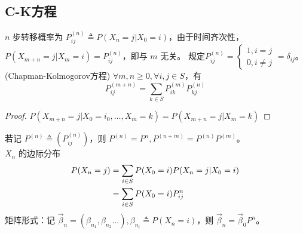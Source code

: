 \documentclass[./main.tex]{subfiles}
\begin{document}
\subsection{C-K方程}
$n$ 步转移概率为 $P_{ij}^{(n)}\triangleq P(X_n=j|X_0=i)$，由于时间齐次性，$P(X_{m+n}=j|X_m=i)=P_{ij}^{(n)}$，即与 $m$ 无关。
规定$P_{ij}^{(n)}=\begin{cases}1,i=j\\0,i\neq j\end{cases}=\delta_{ij}$。\\
(Chapman-Kolmogorov方程) $\forall m,n\ge 0,\forall i,j\in S$，有
\begin{equation}
    P_{ij}^{(m+n)}=\sum_{k\in S}P_{ik}^{(m)}P_{kj}^{(n)}
\end{equation}
\begin{proof}
    $P(X_{m+n}=j|X_0=i_0,\dots,X_m=k)=P(X_{m+n}=j|X_m=k)$
\end{proof}
若记 $P^{(n)}\triangleq (P_{ij}^{(n)})$，则 $P^{(n)}=P^n,P^{(n+m)}=P^{(n)}P^{(m)}$。\\
$X_n$ 的边际分布
\begin{align}
    P(X_n=j)&=\sum_{i\in S}P(X_0=i)P(X_n=j|X_0=i)\notag\\
    &=\sum_{i\in S}P(X_0=i)P_{ij}^{n}
\end{align}
矩阵形式：记 $\vec{\beta}_n=(\beta_{n_1},\beta_{n_2}\dots),\beta_{n_{i}}\triangleq P(X_n=i)$，则 $\vec{\beta}_n=\vec{\beta}_0P^n$。
\end{document}
